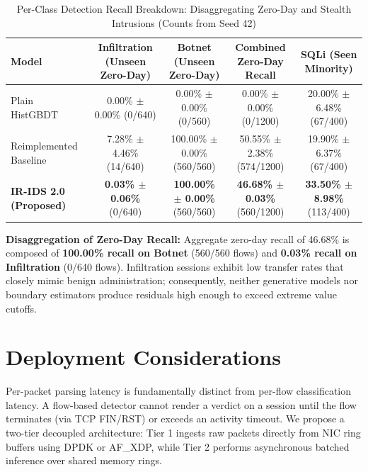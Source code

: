 \documentclass[5p,times,twocolumn]{elsarticle}
\begin{document}
\begin{table}[htbp]
\caption{Per-Class Detection Recall Breakdown: Disaggregating Zero-Day and Stealth Intrusions (Counts from Seed 42)}
\label{tab:per_class_breakdown}
\centering
\begin{tabular}{lcccc}
\toprule
\textbf{Model} & \textbf{Infiltration (Unseen Zero-Day)} & \textbf{Botnet (Unseen Zero-Day)} & \textbf{Combined Zero-Day Recall} & \textbf{SQLi (Seen Minority)} \\
\midrule
Plain HistGBDT & 0.00\% $\pm$ 0.00\% (0/640) & 0.00\% $\pm$ 0.00\% (0/560) & 0.00\% $\pm$ 0.00\% (0/1200) & 20.00\% $\pm$ 6.48\% (67/400) \\
Reimplemented Baseline & 7.28\% $\pm$ 4.46\% (14/640) & 100.00\% $\pm$ 0.00\% (560/560) & 50.55\% $\pm$ 2.38\% (574/1200) & 19.90\% $\pm$ 6.37\% (67/400) \\
\textbf{IR-IDS 2.0 (Proposed)} & \textbf{0.03\% $\pm$ 0.06\%} (0/640) & \textbf{100.00\% $\pm$ 0.00\%} (560/560) & \textbf{46.68\% $\pm$ 0.03\%} (560/1200) & \textbf{33.50\% $\pm$ 8.98\%} (113/400) \\
\bottomrule
\end{tabular}
\end{table}

\textbf{Disaggregation of Zero-Day Recall:} Aggregate zero-day recall of 46.68\% is composed of \textbf{100.00\% recall on Botnet} (560/560 flows) and \textbf{0.03\% recall on Infiltration} (0/640 flows). Infiltration sessions exhibit low transfer rates that closely mimic benign administration; consequently, neither generative models nor boundary estimators produce residuals high enough to exceed extreme value cutoffs.

\section{Deployment Considerations}
Per-packet parsing latency is fundamentally distinct from per-flow classification latency. A flow-based detector cannot render a verdict on a session until the flow terminates (via TCP FIN/RST) or exceeds an activity timeout. We propose a two-tier decoupled architecture: Tier 1 ingests raw packets directly from NIC ring buffers using DPDK or AF\_XDP, while Tier 2 performs asynchronous batched inference over shared memory rings.
\end{document}
